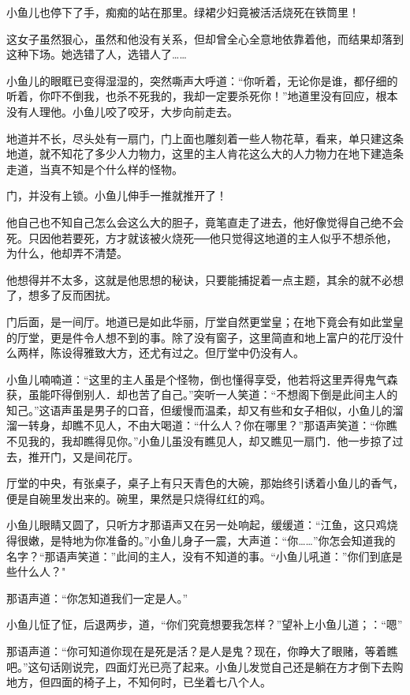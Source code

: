 \documentclass[12pt,oneside]{book}
\begin{document}
小鱼儿也停下了手，痴痴的站在那里。绿裙少妇竟被活活烧死在铁筒里！

这女子虽然狠心，虽然和他没有关系，但却曾全心全意地依靠着他，而结果却落到这种下场。她选错了人，选错人了\ldots\ldots{}

小鱼儿的眼眶已变得湿湿的，突然嘶声大呼道：``你听着，无论你是谁，都仔细的听着，你吓不倒我，也杀不死我的，我却一定要杀死你！''地道里没有回应，根本没有人理他。小鱼儿咬了咬牙，大步向前走去。

地道并不长，尽头处有一扇门，门上面也雕刻着一些人物花草，看来，单只建这条地道，就不知花了多少人力物力，这里的主人肯花这么大的人力物力在地下建造条走道，当真不知是个什么样的怪物。

门，并没有上锁。小鱼儿伸手一推就推开了！

他自己也不知自己怎么会这么大的胆子，竟笔直走了进去，他好像觉得自己绝不会死。只因他若要死，方才就该被火烧死──他只觉得这地道的主人似乎不想杀他，为什么，他却弄不清楚。

他想得并不太多，这就是他思想的秘诀，只要能捕捉着一点主题，其余的就不必想了，想多了反而困扰。

门后面，是一间厅。地道已是如此华丽，厅堂自然更堂皇；在地下竟会有如此堂皇的厅堂，更是件令人想不到的事。除了没有窗子，这里简直和地上富户的花厅没什么两样，陈设得雅致大方，还尤有过之。但厅堂中仍没有人。

小鱼儿喃喃道：``这里的主人虽是个怪物，倒也懂得享受，他若将这里弄得鬼气森获，虽能吓得倒别人．却也苦了自己。''突听一人笑道：``不想阁下倒是此间主人的知己。''这语声虽是男子的口音，但缓慢而温柔，却又有些和女子相似，小鱼儿的溜溜一转身，却瞧不见人，不由大喝道：``什么人？你在哪里？''那语声笑道：``你瞧不见我的，我却瞧得见你。''小鱼儿虽没有瞧见人，却又瞧见一扇门．他一步掠了过去，推开门，又是间花厅。

厅堂的中央，有张桌子，桌子上有只天青色的大碗，那始终引诱着小鱼儿的香气，便是自碗里发出来的。碗里，果然是只烧得红红的鸡。

小鱼儿眼睛又圆了，只听方才那语声又在另一处响起，缓缓道：``江鱼，这只鸡烧得很嫩，是特地为你准备的。''小鱼儿身子一震，大声道：``你\ldots\ldots{}''你怎会知道我的名字？``那语声笑道：''此间的主人，没有不知道的事。``小鱼儿吼道：''你们到底是些什么人？"

那语声道：``你怎知道我们一定是人。''

小鱼儿怔了怔，后退两步，道，``你们究竟想要我怎样？''望补上小鱼儿道；：``嗯''

那语声道：``你可知道你现在是死是活？是人是鬼？现在，你睁大了眼赌，等着瞧吧。''这句话刚说完，四面灯光已亮了起来。小鱼儿发觉自己还是躺在方才倒下去购地方，但四面的椅子上，不知何时，已坐着七八个人。
\end{document}
